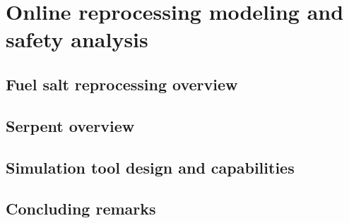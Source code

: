 \chapter[Online reprocessing modeling and safety analysis]{Online reprocessing 
	modeling and safety analysis}
\section{Fuel salt reprocessing overview} \label{sec:reproc-plant}

\section{Serpent overview}

\section{Simulation tool design and capabilities} 
\label{sec:tool_design}

\section{Concluding remarks}